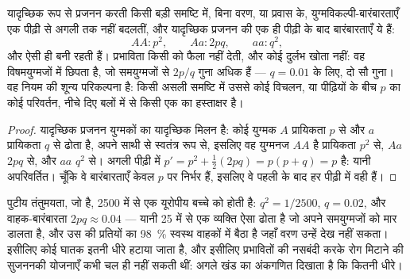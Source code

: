 \begin{theorem}[हार्डी--वाइनबर्ग]\label{thm:b2:population-genetics:hw}
यादृच्छिक रूप से प्रजनन करती किसी बड़ी समष्टि में, बिना वरण, 
या प्रवास के, युग्मविकल्पी-बारंबारताएँ एक पीढ़ी से
अगली तक नहीं बदलतीं, और यादृच्छिक प्रजनन की एक ही पीढ़ी के बाद
 बारंबारताएँ ये हैं:
\[
AA : p^{2}, \qquad Aa : 2pq, \qquad aa : q^{2},
\]
और ऐसी ही बनी रहती हैं। प्रभाविता किसी   को फैला नहीं देती, और
कोई दुर्लभ   खोता नहीं: वह विषमयुग्मजों में छिपता है,
जो समयुग्मजों से $2p/q$ गुना अधिक हैं --- $q = 0.01$ के लिए,
दो सौ गुना। वह नियम  की शून्य
परिकल्पना है: किसी असली समष्टि में उससे कोई विचलन, या पीढ़ियों के बीच
$p$ का कोई परिवर्तन, नीचे दिए बलों में से किसी एक का
हस्ताक्षर है।
\end{theorem}
\begin{proof}
यादृच्छिक प्रजनन युग्मकों का यादृच्छिक मिलन है: कोई युग्मक $A$
प्रायिकता $p$ से और $a$ प्रायिकता $q$ से ढोता है, अपने
साथी से स्वतंत्र रूप से, इसलिए वह युग्मनज $AA$ है प्रायिकता $p^{2}$ से, $Aa$
$2pq$ से, और $aa$ $q^{2}$ से। अगली पीढ़ी में 
$p' = p^{2} + \tfrac12(2pq) = p(p + q) = p$ है: यानी अपरिवर्तित।
चूँकि वे  बारंबारताएँ केवल $p$ पर निर्भर हैं, इसलिए वे पहली के बाद
हर पीढ़ी में वही हैं।
\end{proof}

\begin{example}[कोई बारंबारता पढ़ना]\label{ex:b2:population-genetics:cf}
पुटीय तंतुमयता, जो  है, 2500 में से एक यूरोपीय बच्चे को होती है:
$q^{2} = 1/2500$, $q = 0.02$, और वाहक-बारंबारता $2pq
\approx 0.04$ --- यानी 25 में से एक व्यक्ति ऐसा  ढोता है जो अपने
समयुग्मजों को मार डालता है, और उस  की प्रतियों का \qty{98}{\%}
स्वस्थ वाहकों में बैठा है जहाँ वरण उन्हें देख नहीं सकता। इसीलिए कोई
घातक  इतनी धीरे हटाया जाता है, और इसीलिए प्रभावितों की नसबंदी करके
 रोग मिटाने की सुजननकी योजनाएँ कभी
चल ही नहीं सकती थीं: अगले खंड का अंकगणित दिखाता है कि कितनी
धीरे।
\end{example}

